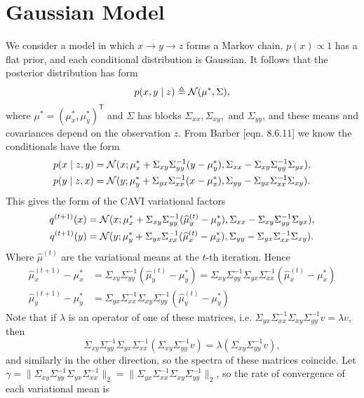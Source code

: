 \documentclass{article}
\begin{document}
\section{Gaussian Model} 

We consider a model in which $x\to y\to z$ forms a Markov chain, $p(x)\propto 1$ has a flat prior, and each conditional distribution is Gaussian. It follows that the posterior distribution has form
\begin{align}
p(x,y\mid z) \triangleq \mathcal{N}(\mu^*,\Sigma),
\end{align}
where $\mu^* = (\mu_x^*,\mu_y^*)^{\mathsf T}$ and $\Sigma$ has blocks $\Sigma_{xx}, \Sigma_{xy},$ and $\Sigma_{yy}$, and these means and covariances depend on the observation $z$. From Barber [eqn. 8.6.11] we know the conditionals have the form 
\begin{align}
p(x\mid z,y) &= \mathcal{N}(x; \mu_x^*+\Sigma_{xy}\Sigma_{yy}^{-1}(y-\mu_y^*),\Sigma_{xx} - \Sigma_{xy}\Sigma_{yy}^{-1}\Sigma_{yx}), \\
p(y\mid z,x) &= \mathcal{N}(y; \mu_y^*+\Sigma_{yx}\Sigma_{xx}^{-1}(x-\mu_x^*),\Sigma_{yy} - \Sigma_{yx}\Sigma_{xx}^{-1}\Sigma_{xy}).
\end{align}
This gives the form of the CAVI variational factors 
\begin{align}
q^{(t+1)}(x) &= \mathcal{N}(x; \mu_x^*+\Sigma_{xy}\Sigma_{yy}^{-1}(\widehat \mu_y^{(t)}-\mu_y^*),\Sigma_{xx} - \Sigma_{xy}\Sigma_{yy}^{-1}\Sigma_{yx}), \\
q^{(t+1)}(y) &= \mathcal{N}(y; \mu_y^*+\Sigma_{yx}\Sigma_{xx}^{-1}(\widehat\mu_x^{(t)}-\mu_x^*),\Sigma_{yy} - \Sigma_{yx}\Sigma_{xx}^{-1}\Sigma_{xy}).
\end{align}
Where $\widehat\mu^{(t)}$ are the variational means at the $t$-th iteration. Hence 
\begin{align}
\widehat\mu_x^{(t+1)}-\mu_x^*
&= \Sigma_{xy}\Sigma_{yy}^{-1}(\widehat \mu_y^{(t)}-\mu_y^*)
= \Sigma_{xy}\Sigma_{yy}^{-1}\Sigma_{yx}\Sigma_{xx}^{-1}(\widehat\mu_x^{(t)}-\mu_x^*) \\
\widehat\mu_y^{(t+1)}-\mu_y^*
&= \Sigma_{yx}\Sigma_{xx}^{-1}\Sigma_{xy}\Sigma_{yy}^{-1}(\widehat\mu_y^{(t)}-\mu_y^*)
\end{align}
Note that if $\lambda$ is an operator of one of these matrices, i.e. $\Sigma_{yx}\Sigma_{xx}^{-1}\Sigma_{xy}\Sigma_{yy}^{-1} v = \lambda v$, then 
$$
\Sigma_{xy}\Sigma_{yy}^{-1}\Sigma_{yx}\Sigma_{xx}^{-1}(\Sigma_{xy}\Sigma_{yy}^{-1} v) = \lambda (\Sigma_{xy}\Sigma_{yy}^{-1}v),
$$
and similarly in the other direction, so the spectra of these matrices coincide. Let $\gamma = \|\Sigma_{xy}\Sigma_{yy}^{-1}\Sigma_{yx}\Sigma_{xx}^{-1}\|_2 = \|\Sigma_{yx}\Sigma_{xx}^{-1}\Sigma_{xy}\Sigma_{yy}^{-1}\|_2$, so the rate of convergence of each variational mean is
\end{document}
